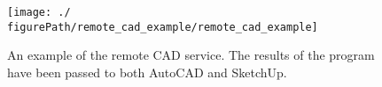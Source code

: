 


\begin{figure}
  \centering
  \texttt{[image: ./\\figurePath/remote\_cad\_example/remote\_cad\_example]}
  \caption[An example of the remote CAD service.]{An example of the remote CAD service. The results of the program have been passed to both AutoCAD and SketchUp.}
  \label{fig:remote:cad:example}
\end{figure}
